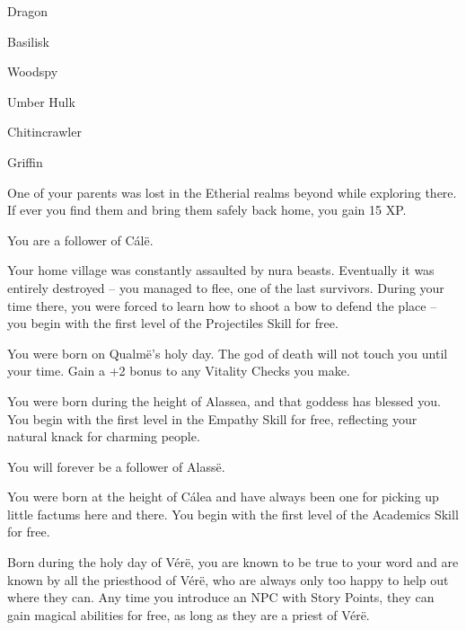 \begin{multicols}{2}
\begin{list}{\addtocounter{list}{1}\textbf{:}}{\raggedleft}
\begin{list}{\addtocounter{enc}{-1}}{}
    \item Dragon

    \item Basilisk

    \item Woodspy

    \item Umber Hulk

    \item Chitincrawler

    \item Griffin

  \end{list}

  \item
  One of your parents was lost in the Etherial realms beyond while exploring there.
  If ever you find them and bring them safely back home, you gain 15 XP.

  You are a follower of C\'al\"e.

  \item
  Your home village was constantly assaulted by nura beasts.
  Eventually it was entirely destroyed -- you managed to flee, one of the last survivors.
  During your time there, you were forced to learn how to shoot a bow to defend the place -- you begin with the first level of the Projectiles Skill for free.

  \item
  You were born on Qualm\"{e}'s holy day.
  The god of death will not touch you until your time.
  Gain a +2 bonus to any Vitality Checks you make.

  \item
  You were born during the height of Alassea, and that goddess has blessed you.
  You begin with the first level in the Empathy Skill for free, reflecting your natural knack for charming people.

  You will forever be a follower of Alass\"e.

  \item
  You were born at the height of C\'{a}lea and have always been one for picking up little factums here and there.
  You begin with the first level of the Academics Skill for free.

  \item
  Born during the holy day of V\'{e}r\"{e}, you are known to be true to your word and are known by all the priesthood of V\'{e}r\"{e}, who are always only too happy to help out where they can.
  Any time you introduce an NPC with Story Points, they can gain magical abilities for free, as long as they are a priest of V\'er\"e.


\end{list}
\end{multicols}
